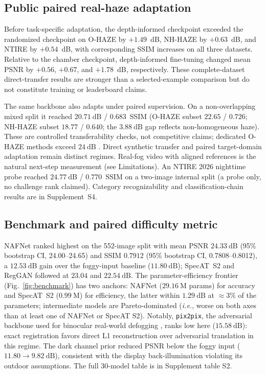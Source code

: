 \documentclass{optica-article}
\begin{document}
\subsection{Public paired real-haze adaptation}
\label{subsec:realhaze_results}
 
Before task-specific adaptation, the depth-informed checkpoint exceeded
the randomized checkpoint on O-HAZE by $+1.49$~dB, NH-HAZE by
$+0.63$~dB, and NTIRE by $+0.54$~dB, with corresponding SSIM increases
on all three datasets. Relative to the chamber checkpoint, depth-informed
fine-tuning changed mean PSNR by $+0.56$, $+0.67$, and $+1.78$~dB,
respectively. These complete-dataset direct-transfer results are stronger
than a selected-example comparison but do not constitute training or
leaderboard claims.

The same backbone also adapts under paired supervision. On a
non-overlapping mixed split it reached $20.71~\mathrm{dB}$ /
$0.683$~SSIM (O-HAZE subset $22.65$ / $0.726$; NH-HAZE subset
$18.77$ / $0.640$; the $3.88~\mathrm{dB}$ gap reflects
non-homogeneous haze). These are controlled transferability checks,
not competitive claims; dedicated O-HAZE methods exceed
$24~\mathrm{dB}$ \cite{chen2024pttd,chen2025dehazexl}. Direct synthetic
transfer and paired target-domain adaptation remain distinct regimes.
Real-fog video with aligned references is the natural next-step
measurement (see Limitations).
An NTIRE 2026 nighttime probe reached $24.77~\mathrm{dB}$ /
$0.770$~SSIM on a two-image internal split (a probe only, no
challenge rank claimed)\cite{ancuti2026ntire, ancuti2026nt}. Category recognizability and
classification-chain results are in Supplement~S4.

\subsection{Benchmark and paired difficulty metric}
\label{subsec:benchmark_results}
 
NAFNet ranked highest on the 552-image split with mean PSNR
$24.33~\mathrm{dB}$ (95\% bootstrap CI, 24.00--24.65) and SSIM $0.7912$ (95\% bootstrap CI, 0.7808--0.8012), a $12.53~\mathrm{dB}$ gain
over the foggy-input baseline ($11.80~\mathrm{dB}$); SpecAT~S2\cite{yao2024specat} and
RegGAN followed at $23.04$ and $22.54~\mathrm{dB}$. The parameter-efficiency frontier
(Fig.~\ref{fig:benchmark}) has two anchors: NAFNet
($29.16~\mathrm{M}$ params) for accuracy and SpecAT~S2
($0.99~\mathrm{M}$) for efficiency, the latter within
$1.29~\mathrm{dB}$ at $\approx 3\%$ of the parameters; intermediate models are Pareto-dominated (\emph{i.e.}, worse on both axes than at least one of NAFNet or SpecAT S2). Notably, \texttt{pix2pix}, the adversarial
backbone used for binocular real-world defogging
\cite{isola2017pix2pix, pollak2024stereofog}, ranks low here ($15.58~\mathrm{dB}$):
exact registration favors direct L1 reconstruction over adversarial
translation in this regime. The dark channel prior
\cite{he2010single} reduced PSNR below the foggy input ($11.80
\rightarrow 9.82~\mathrm{dB}$), consistent with the display
back-illumination violating its outdoor assumptions. The full
30-model table is in Supplement table S2.
 
\end{document}
